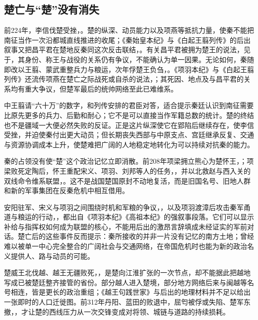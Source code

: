 \subsection{楚亡与“楚”没有消失}

前224年，李信伐楚受挫，。楚的纵深、动员能力以及项燕等抵抗力量，使秦不能把南征当作一次沿都城直线推进的收尾；《秦始皇本纪》与《白起王翦列传》的后出叙事又把昌平君在楚地反秦同这次反击联结，。有关昌平君被拥为楚王的说法，见于，其身份、称王与战役的关系仍有争议，不能确认为单一因果。无论如何，秦随即改以王翦、蒙武重整兵力与粮运，次年俘楚王负刍，。《项羽本纪》与《白起王翦列传》还流传项燕在楚亡之际战死或自杀的说法，；其死因、地点及与昌平君的关系均有重大争议，但楚军最后的统帅网络至此已难维系。

中王翦请“六十万”的数字，和列传安排的君臣对答，适合提示秦廷认识到南征需要比原先更多的兵力、后勤和耐心；它不是可以直接当作军籍总数的统计。楚的终结也不是疆域一大便必然失败的反证。正是这片纵深使它在郢陷后继续存在，使李信受挫，并迫使秦付出更大动员；但长期丧失西部与中原支点、宫廷继承反复、交通与资源协调成本上升，使楚难把广阔的人地稳定地转化为可以持续对抗秦的能力。

秦的占领没有使“楚”这个政治记忆立即消散。前208年项梁拥立熊心为楚怀王，；项梁败死定陶后，怀王重配宋义、项羽、刘邦等人的任务，，并以北救赵与西入关的双线命令维系联盟，。这不是战国楚国原封不动地复活，而是旧国名号、旧地人群和新的军事集团在反秦危机中相互借用。

安阳驻军、宋义与项羽之间围绕时机和军粮的争议，，以及项羽渡漳后攻击秦军甬道与粮运的行动，，都出自《项羽本纪》《高祖本纪》的强叙事段落。它们可以显示补给与指挥权如何成为联盟的核心，不能用后出的激昂言辞填成未经证实的军前对话。楚亡后的这些事件反而提示：秦所接收的并非一片没有记忆的南方土地；曾经难以被单一中心完全整合的广阔社会与交通网络，在帝国危机时也能为新的政治名义提供人、路与动员的可能。

楚威王北伐越、越王无疆败死，，是楚向江淮扩张的一次节点，却不能据此把越地写成已被楚廷整齐接管的省份。部分越人进入楚境，部分地方网络后来与闽越等名号相连，皆是更长的政治重组；《越王句践世家》与后出的地理材料并不足以给出一张即时的人口迁徙图。前312年丹阳、蓝田的败退中，屈匄被俘或失陷、楚军东撤，，才让楚的西线压力从一次交锋变成对将领、城链与道路的持续损耗。

